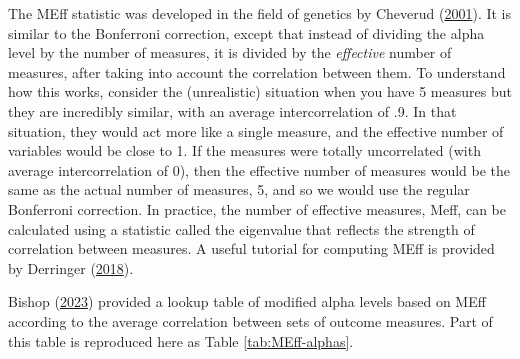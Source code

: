 \documentclass{krantz}
\begin{document}
The MEff statistic was developed in the field of genetics by Cheverud (\protect\hyperlink{ref-cheverud2001}{2001}). It is similar to the Bonferroni correction, except that instead of dividing the alpha level by the number of measures, it is divided by the \emph{effective} number of measures, after taking into account the correlation between them. To understand how this works, consider the (unrealistic) situation when you have 5 measures but they are incredibly similar, with an average intercorrelation of .9. In that situation, they would act more like a single measure, and the effective number of variables would be close to 1. If the measures were totally uncorrelated (with average intercorrelation of 0), then the effective number of measures would be the same as the actual number of measures, 5, and so we would use the regular Bonferroni correction. In practice, the number of effective measures, Meff, can be calculated using a statistic called the eigenvalue that reflects the strength of correlation between measures. A useful tutorial for computing MEff is provided by Derringer (\protect\hyperlink{ref-derringer2018a}{2018}).

Bishop (\protect\hyperlink{ref-bishop2023b}{2023}) provided a lookup table of modified alpha levels based on MEff according to the average correlation between sets of outcome measures. Part of this table is reproduced here as Table \ref{tab:MEff-alphas}.
\end{document}

